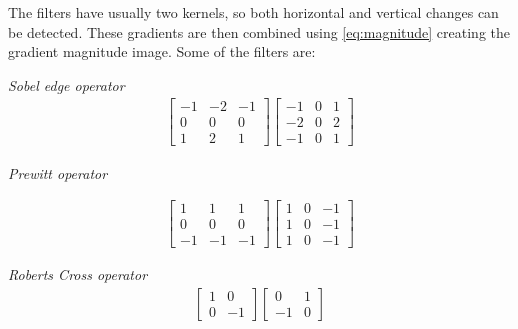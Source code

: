 The filters have usually two kernels, so both horizontal and vertical changes can be detected. These gradients are then combined using \ref{eq:magnitude} creating the gradient magnitude image. Some of the filters are:

\textit{Sobel edge operator}
\[ 
\begin{array}{cc}

    \begin{bmatrix}
    -1 & -2 & -1 \\
    0 & 0 & 0 \\
    1 & 2 & 1 
    \end{bmatrix} 
                    
    \begin{bmatrix}
    -1 & 0 & 1 \\
    -2 & 0 & 2 \\
    -1 & 0 & 1
    \end{bmatrix}
    
\end{array}
\]
\pagebreak

\textit{Prewitt operator}

\[ 
\begin{array}{cc}

    \begin{bmatrix}
    1 & 1 & 1 \\
    0 & 0 & 0 \\
    -1 & -1 & -1 
    \end{bmatrix} 

    \begin{bmatrix}
    1 & 0 & -1 \\
    1 & 0 & -1 \\
    1 & 0 & -1
    \end{bmatrix}
    
\end{array}
\]

\textit{Roberts Cross operator}
\[ 
\begin{array}{cc}

    \begin{bmatrix}
    1 & 0 \\
    0 & -1 
    \end{bmatrix} 

    \begin{bmatrix}
    0 & 1 \\
    -1 & 0 
    \end{bmatrix}
    
\end{array}
\]

